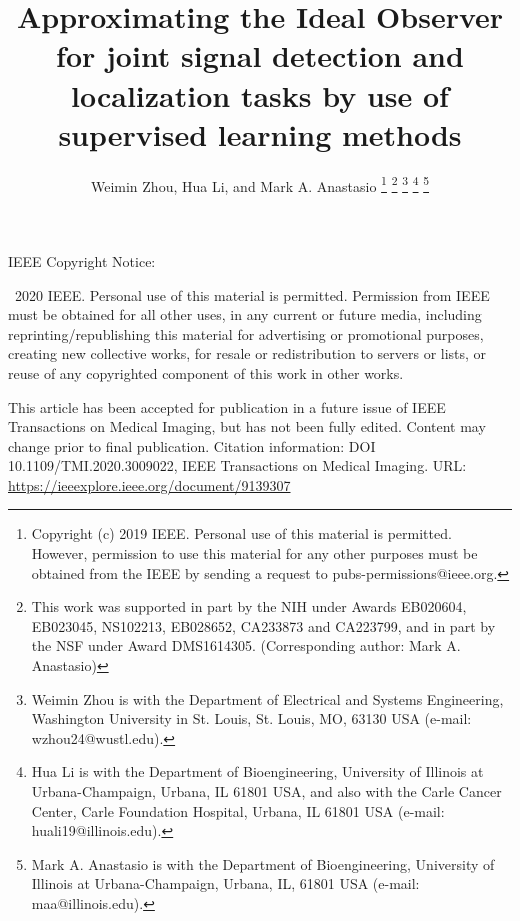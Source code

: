 \documentclass[journal]{IEEEtran}
\begin{document}
\thispagestyle{empty}
\onecolumn
\begin{Large}IEEE Copyright Notice:\end{Large}

\vspace{1cm}
\textcopyright \ 2020 IEEE. Personal use of this material is permitted. Permission from IEEE must be obtained for all other uses, in any current or future media, including reprinting/republishing this material for advertising or promotional purposes, creating new collective works, for resale or redistribution to servers or lists, or reuse of any copyrighted component of this work in other works.

\vspace{1cm}
This article has been accepted for publication in a future issue of IEEE Transactions on Medical Imaging, but has not been fully edited. Content may change prior to final publication. Citation information:
DOI 10.1109/TMI.2020.3009022, IEEE Transactions on Medical Imaging.
URL: \url{https://ieeexplore.ieee.org/document/9139307}


\newpage

\twocolumn
\setcounter{page}{1}


\title{Approximating the Ideal Observer for joint signal detection and localization tasks by use of supervised learning methods}
\author{Weimin Zhou, Hua Li, and Mark A. Anastasio
\thanks{Copyright (c) 2019 IEEE. Personal use of this material is permitted. However, permission to use this material for any other purposes must be obtained from the IEEE by sending a request to pubs-permissions@ieee.org.}
\thanks{This work was supported in part by the NIH under Awards EB020604, EB023045, NS102213, EB028652, CA233873 and CA223799, and in part by the NSF under Award  DMS1614305. (Corresponding author: Mark A. Anastasio)}
\thanks{Weimin Zhou is with the Department of 
Electrical and Systems Engineering, Washington University in St. Louis, St. Louis,
MO, 63130 USA (e-mail: wzhou24@wustl.edu).}%
\thanks{Hua Li is with the Department of Bioengineering, University of Illinois at
Urbana-Champaign, Urbana, IL 61801 USA, and also with the Carle
Cancer Center, Carle Foundation Hospital, Urbana, IL 61801 USA
(e-mail: huali19@illinois.edu).}
\thanks{Mark A. Anastasio is with the Department of 
Bioengineering, University of Illinois at Urbana-Champaign, Urbana,
IL, 61801 USA (e-mail: maa@illinois.edu).}}

\maketitle
\end{document}
